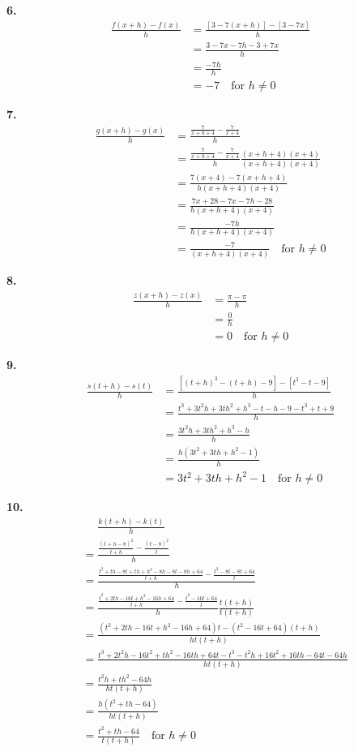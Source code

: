 \documentclass[10pt,oneside,]{book}
\theoremstyle{plain}
\theoremstyle{definition}
\numberwithin{equation}{section}
\newcommand{\fe}[2]{#1\mathopen{}\left(#2\right)\mathclose{}}
\begin{document}
\par\smallskip
\noindent\textbf{6.}\quad{}\begin{align*}
\frac{\fe{f}{x+h}-\fe{f}{x}}{h}&=\frac{\left[3-7(x+h)\right]-\left[3-7x\right]}{h}\\
&=\frac{3-7x-7h-3+7x}{h}\\
&=\frac{-7h}{h}\\
&=-7\quad\text{for $h\neq0$}
\end{align*}%
\par\smallskip
\noindent\textbf{7.}\quad{}\begin{align*}
\frac{\fe{g}{x+h}-\fe{g}{x}}{h}&=\frac{\frac{7}{x+h+4}-\frac{7}{x+4}}{h}\\
&=\frac{\frac{7}{x+h+4}-\frac{7}{x+4}}{h}\frac{(x+h+4)(x+4)}{(x+h+4)(x+4)}\\
&=\frac{7(x+4)-7(x+h+4)}{h(x+h+4)(x+4)}\\
&=\frac{7x+28-7x-7h-28}{h(x+h+4)(x+4)}\\
&=\frac{-7h}{h(x+h+4)(x+4)}\\
&=\frac{-7}{(x+h+4)(x+4)}\quad\text{for $h\neq0$}
\end{align*}%
\par\smallskip
\noindent\textbf{8.}\quad{}\begin{align*}
\frac{\fe{z}{x+h}-\fe{z}{x}}{h}&=\frac{\pi-\pi}{h}\\
&=\frac{0}{h}\\
&=0\quad\text{for $h\neq0$}
\end{align*}%
\par\smallskip
\noindent\textbf{9.}\quad{}\begin{align*}
\frac{\fe{s}{t+h}-\fe{s}{t}}{h}&=\frac{\left[(t+h)^3-(t+h)-9\right]-\left[t^3-t-9\right]}{h}\\
&=\frac{t^3+3t^2h+3th^2+h^3-t-h-9-t^3+t+9}{h}\\
&=\frac{3t^2h+3th^2+h^3-h}{h}\\
&=\frac{h(3t^2+3th+h^2-1)}{h}\\
&=3t^2+3th+h^2-1\quad\text{for $h\neq0$}
\end{align*}%
\par\smallskip
\noindent\textbf{10.}\quad{}\begin{align*}
&\phantom{={}}\frac{\fe{k}{t+h}-\fe{k}{t}}{h}\\
&=\frac{\frac{(t+h-8)^2}{t+h}-\frac{(t-8)^2}{t}}{h}\\
&=\frac{\frac{t^2+th-8t+th+h^2-8h-8t-8h+64}{t+h}-\frac{t^2-8t-8t+64}{t}}{h}\\
&=\frac{\frac{t^2+2th-16t+h^2-16h+64}{t+h}-\frac{t^2-16t+64}{t}}{h}\frac{t(t+h)}{t(t+h)}\\
&=\frac{(t^2+2th-16t+h^2-16h+64)t-(t^2-16t+64)(t+h)}{ht(t+h)}\\
&=\frac{t^3+2t^2h-16t^2+th^2-16th+64t-t^3-t^2h+16t^2+16th-64t-64h}{ht(t+h)}\\
&=\frac{t^2h+th^2-64h}{ht(t+h)}\\
&=\frac{h(t^2+th-64)}{ht(t+h)}\\
&=\frac{t^2+th-64}{t(t+h)}\quad\text{for $h\neq0$}
\end{align*}%
\end{document}
